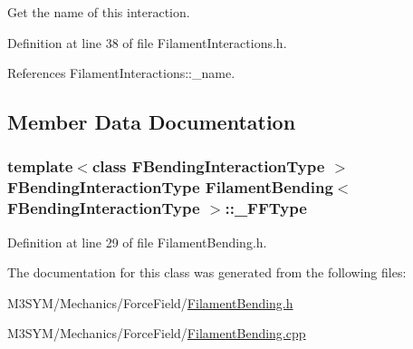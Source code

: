 Get the name of this interaction. 



Definition at line 38 of file Filament\+Interactions.\+h.



References Filament\+Interactions\+::\+\_\+name.



\subsection{Member Data Documentation}
\hypertarget{classFilamentBending_a48702549ba5c7f9e511a770ec5e78886}{
\subsubsection[{\+\_\+\+F\+F\+Type}]{\setlength{\rightskip}{0pt plus 5cm}template$<$class F\+Bending\+Interaction\+Type $>$ F\+Bending\+Interaction\+Type {\bf Filament\+Bending}$<$ F\+Bending\+Interaction\+Type $>$\+::\+\_\+\+F\+F\+Type\hspace{0.3cm}{\ttfamily [private]}}}\label{classFilamentBending_a48702549ba5c7f9e511a770ec5e78886}


Definition at line 29 of file Filament\+Bending.\+h.



The documentation for this class was generated from the following files\+:\begin{DoxyCompactItemize}
\item 
M3\+S\+Y\+M/\+Mechanics/\+Force\+Field/\hyperlink{FilamentBending_8h}{Filament\+Bending.\+h}\item 
M3\+S\+Y\+M/\+Mechanics/\+Force\+Field/\hyperlink{FilamentBending_8cpp}{Filament\+Bending.\+cpp}\end{DoxyCompactItemize}
